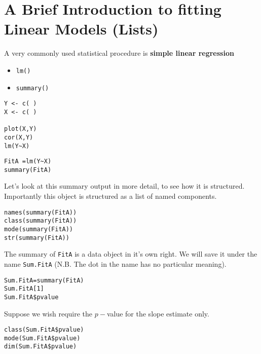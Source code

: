 \documentclass[a4paper,12pt]{article}
\begin{document}
\section{A Brief Introduction to fitting Linear Models (Lists)}

A very commonly used statistical procedure is \textbf{simple linear regression}
\begin{itemize}
\item \texttt{lm()}
\item \texttt{summary()}
\end{itemize}

\begin{framed}
\begin{verbatim}
Y <- c( )
X <- c( )

plot(X,Y)
cor(X,Y)
lm(Y~X)
\end{verbatim}
\end{framed}
\begin{framed}
\begin{verbatim}
FitA =lm(Y~X)
summary(FitA)
\end{verbatim}
\end{framed}
Let's look at this summary output in more detail, to see how it is structured. Importantly this object is structured as a list of named components.
\begin{framed}
\begin{verbatim}
names(summary(FitA))
class(summary(FitA))
mode(summary(FitA))
str(summary(FitA))
\end{verbatim}
\end{framed}

The summary of \texttt{FitA} is a data object in it's own right. We will save it under the name \texttt{Sum.FitA} (N.B. The dot in the name has no particular meaning).
\begin{framed}
\begin{verbatim}
Sum.FitA=summary(FitA)
Sum.FitA[1]
Sum.FitA$pvalue
\end{verbatim}
\end{framed}
Suppose we wish require the $p-$value for the slope estimate only.
\begin{framed}
\begin{verbatim}
class(Sum.FitA$pvalue)
mode(Sum.FitA$pvalue)
dim(Sum.FitA$pvalue)
\end{verbatim}
\end{framed}
\end{document}
